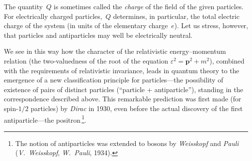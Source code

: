 The quantity~$Q$ is sometimes called the \emph{charge} of the field of the given particles. For electrically charged particles,~$Q$ determines, in particular, the total electric charge of the system (in units of the elementary charge~$e$). Let us stress, however, that particles and antiparticles may well be electrically neutral.

We see in this way how the character of the relativistic energy--momentum relation (the two-valuedness of the root of the equation $\varepsilon^2 = \mathbf{p}^2 + m^2$), combined with the requirements of relativistic invariance, leads in quantum theory to the emergence of a new classification principle for particles---the possibility of existence of pairs of distinct particles (``particle + antiparticle''),
standing in the correspondence described above. This remarkable prediction was first made (for spin-$1/2$ particles) by \emph{Dirac} in 1930, even before the actual discovery of the first antiparticle---the positron\,\footnote{The notion of antiparticles was extended to bosons by \emph{Weisskopf} and \emph{Pauli} (\emph{V.~Weisskopf}, \emph{W.~Pauli}, 1934).}.

